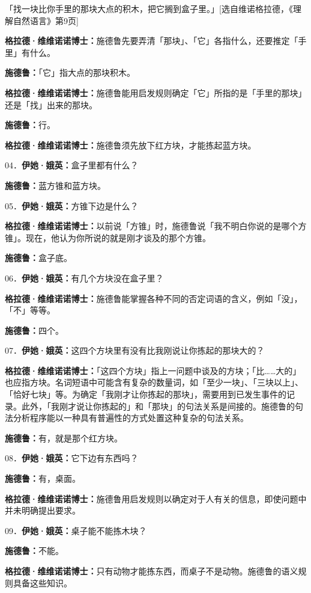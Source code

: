 \documentclass[
  12pt,
  twoside,
  openright,
  oldfontcommands,
]{memoir}
\newcommand{\dialogname}[1]{{\heifamily\bfseries #1}}
\begin{document}
「找一块比你手里的那块大点的积木，把它搁到盒子里。」{[}选自维诺格拉德，《理解自然语言》第9页{]}

\dialogname{格拉德·维维诺诺博士：}施德鲁先要弄清「那块」、「它」各指什么，还要推定「手里」有什么。

\dialogname{施德鲁：}「它」指大点的那块积木。

\dialogname{格拉德·维维诺诺博士：}施德鲁能用启发规则确定「它」所指的是「手里的那块」还是「找」出来的那块。

\dialogname{施德鲁：}行。

\dialogname{格拉德·维维诺诺博士：}施德鲁须先放下红方块，才能拣起蓝方块。

04．\dialogname{伊她·娥英：}盒子里都有什么？

\dialogname{施德鲁：}蓝方锥和蓝方块。

05．\dialogname{伊她·娥英：}方锥下边是什么？

\dialogname{格拉德·维维诺诺博士：}以前说「方锥」时，施德鲁说「我不明白你说的是哪个方锥」。现在，他认为你所说的就是刚才谈及的那个方锥。

\dialogname{施德鲁：}盒子底。

06．\dialogname{伊她·娥英：}有几个方块没在盒子里？

\dialogname{格拉德·维维诺诺博士：}施德鲁能掌握各种不同的否定词语的含义，例如「没」，「不」等等。

\dialogname{施德鲁：}四个。

07．\dialogname{伊她·娥英：}这四个方块里有没有比我刚说让你拣起的那块大的？

\dialogname{格拉德·维维诺诺博士：}「这四个方块」指上一问题中谈及的方块；「比\ldots\ldots 大的」也应指方块。名词短语中可能含有复杂的数量词，如「至少一块」、「三块以上」、「恰好七块」等。为确定「我刚才让你拣起的那块」，需要用到已发生事件的记录。此外，「我刚才说让你拣起的」和「那块」的句法关系是间接的。施德鲁的句法分析程序能以一种具有普遍性的方式处置这种复杂的句法关系。

\dialogname{施德鲁：}有，就是那个红方块。

08．\dialogname{伊她·娥英：}它下边有东西吗？

\dialogname{施德鲁：}有，桌面。

\dialogname{格拉德·维维诺诺博士：}施德鲁用启发规则以确定对于人有关的信息，即使问题中并未明确提出要求。

09．\dialogname{伊她·娥英：}桌子能不能拣木块？

\dialogname{施德鲁：}不能。

\dialogname{格拉德·维维诺诺博士：}只有动物才能拣东西，而桌子不是动物。施德鲁的语义规则具备这些知识。
\end{document}
